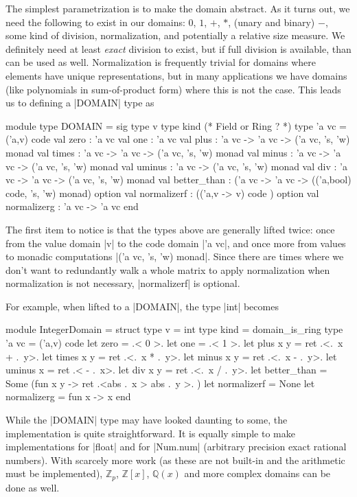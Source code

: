 \documentclass{llncs}
\begin{document}
The simplest parametrization is to make the domain abstract.  As it 
turns out, we need the following to exist in our domains:  $0$, $1$,
$+$, $*$, (unary and binary) $-$, some kind of division, normalization,
and potentially a relative size measure.  We definitely need at least
\emph{exact} division to exist, but if full division is available, than
can be used as well.  Normalization is frequently trivial for domains
where elements have unique representations, but in many applications
we have domains (like polynomials in sum-of-product form) where this
is not the case.  This leads us to defining a |DOMAIN| type as
\begin{small}
\begin{code}
module type DOMAIN = sig
  type v
  type kind (* Field or Ring ? *)
  type 'a vc = ('a,v) code
  val zero : 'a vc
  val one : 'a vc
  val plus : 'a vc -> 'a vc -> ('a vc, 's, 'w) monad
  val times : 'a vc -> 'a vc -> ('a vc, 's, 'w) monad
  val minus : 'a vc -> 'a vc -> ('a vc, 's, 'w) monad
  val uminus : 'a vc -> ('a vc, 's, 'w) monad
  val div : 'a vc -> 'a vc -> ('a vc, 's, 'w) monad
  val better_than : ('a vc -> 'a vc -> 
      (('a,bool) code, 's, 'w) monad) option
  val normalizerf : (('a,v -> v) code ) option
  val normalizerg : 'a vc -> 'a vc
end 
\end{code}
\end{small}
\noindent  The first item to notice is that the types above are
generally lifted twice: once from the value domain |v| to the code
domain |'a vc|, and once more from values to monadic computations
|('a vc, 's, 'w) monad|.  Since there are times where we don't want
to redundantly walk a whole matrix to apply normalization when 
normalization is not necessary, |normalizerf| is optional.

For example, when lifted to a |DOMAIN|, the type |int| becomes
\begin{small}
\begin{code}
module IntegerDomain = struct
    type v = int
    type kind = domain_is_ring
    type 'a vc = ('a,v) code
    let zero = .< 0 >.  
    let one = .< 1 >. 
    let plus x y = ret .<.~x + .~y>. 
    let times x y = ret .<.~x * .~y>.
    let minus x y = ret .<.~x - .~y>.
    let uminus x = ret .< - .~x>.
    let div x y = ret .<.~x / .~y>. 
    let better_than = Some (fun x y -> ret .<abs .~x > abs .~y >. )
    let normalizerf = None 
    let normalizerg = fun x -> x
end
\end{code}
\end{small}
\noindent While the |DOMAIN| type may have looked daunting to some, 
the implementation is quite straightforward.  It is equally simple to 
make implementations for |float| and for |Num.num| (arbitrary precision
exact rational numbers).  With scarcely more work (as these are not 
built-in and the arithmetic must be implemented), $\mathbb{Z}_p$,
$\mathbb{Z}\left[x\right]$, $\mathbb{Q}\left(x\right)$ and more
complex domains can be done as well.
\end{document}
